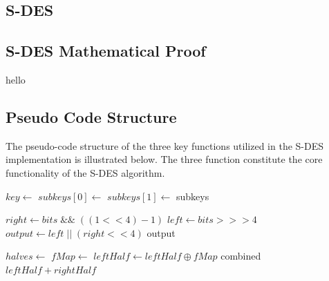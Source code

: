 \documentclass[]{article}
\begin{document}
\break

\vspace*{-0.8cm}
\begin{center}
	\section*{S-DES}
\end{center}

\vspace*{0.8cm}
\subsection*{S-DES Mathematical Proof}

hello

\subsection*{Pseudo Code Structure}

The pseudo-code structure of the three key functions utilized in the S-DES implementation is illustrated below. The three function constitute the core functionality of the S-DES algorithm.\\

\begin{algorithmic}
	\State $key\gets $ 
	\State {}
	\State $subkeys[0]\gets $ 
	\State {}
	\State $subkeys[1]\gets $ 
	\State \Return subkeys
\EndFunction
\end{algorithmic}


\vspace{0.5cm}

\begin{algorithmic}
		\State $ right \gets bits \;\&\&\; ( ( 1 << 4 ) - 1 ) $
		\State $ left \gets bits >>> 4 $
		\State $ output \gets left \;||\; ( right << 4 )$
		\State \Return output
	\EndFunction
\end{algorithmic}

\vspace{0.5cm}

\begin{algorithmic}
	
	\State $halves\gets $ 
	\State $fMap \gets $ 	
	\State $ leftHalf \gets leftHalf \oplus fMap $
	\State \Return combined $ leftHalf + rightHalf $
	\EndFunction
\end{algorithmic}
\end{document}
